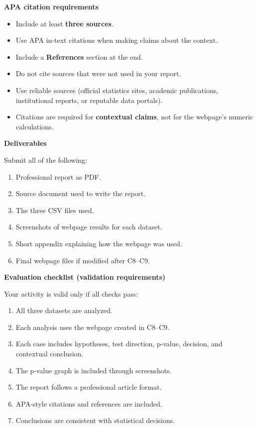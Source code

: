 \documentclass[12pt]{article}
\newcommand{\SubsectionBox}[1]{%
\noindent\colorbox{gray!30}{%
\parbox{\linewidth}{\textbf{#1}}%
}\par\vspace{0.35cm}%
}
\begin{document}
\SubsectionBox{APA citation requirements}
\begin{itemize}
\item Include at least \textbf{three sources}.
\item Use APA in-text citations when making claims about the context.
\item Include a \textbf{References} section at the end.
\item Do not cite sources that were not used in your report.
\item Use reliable sources (official statistics sites, academic publications, institutional reports, or reputable data portals).
\item Citations are required for \textbf{contextual claims}, not for the webpage's numeric calculations.
\end{itemize}

\SubsectionBox{Deliverables}
Submit all of the following:
\begin{enumerate}
\item Professional report as PDF.
\item Source document used to write the report.
\item The three CSV files used.
\item Screenshots of webpage results for each dataset.
\item Short appendix explaining how the webpage was used.
\item Final webpage files if modified after C8--C9.
\end{enumerate}

\SubsectionBox{Evaluation checklist (validation requirements)}
Your activity is valid only if all checks pass:
\begin{enumerate}
\item All three datasets are analyzed.
\item Each analysis uses the webpage created in C8--C9.
\item Each case includes hypotheses, test direction, p-value, decision, and contextual conclusion.
\item The p-value graph is included through screenshots.
\item The report follows a professional article format.
\item APA-style citations and references are included.
\item Conclusions are consistent with statistical decisions.
\end{enumerate}
\end{document}
